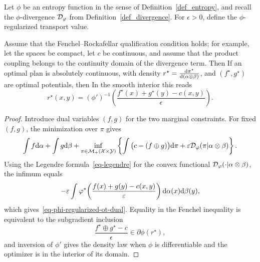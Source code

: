 Let $\phi$ be an entropy function in the sense of Definition~\ref{def_entropy}, and recall the $\phi$-divergence $\mathcal{D}_\varphi$ from Definition~\ref{def_divergence}. For $\epsilon>0$, define the $\phi$-regularized transport value.
\begin{defn}\label{def-phi-regularized-ot}
\end{defn}

\begin{prop}\label{prop-phi-regularized-ot-dual}
	Assume that the Fenchel--Rockafellar qualification condition holds; for example, let the spaces be compact, let $c$ be continuous, and assume that the product coupling belongs to the continuity domain of the divergence term. Then
	If an optimal plan is absolutely continuous, with density $r^\star=\frac{\mathrm{d}\pi^\star}{\mathrm{d}(\alpha\otimes\beta)}$, and $(f^\star,g^\star)$ are optimal potentials, then
	In the smooth interior this reads
	\[
		r^\star(x,y)
		=
		(\phi')^{-1}
		\!\left(\frac{f^\star(x)+g^\star(y)-c(x,y)}{\epsilon}\right).
	\]
\end{prop}

\begin{proof}
	Introduce dual variables $(f,g)$ for the two marginal constraints. For fixed $(f,g)$, the minimization over $\pi$ gives
	\[
		\int f\mathrm{d}\alpha+\int g\mathrm{d}\beta
		+
		\inf_{\pi\in\mathcal{M}_+(\mathcal{X}\times\mathcal{Y})}
		\left\{
		\int\big(c-(f\oplus g)\big)\mathrm{d}\pi
		+
		\varepsilon\mathcal{D}_\varphi(\pi|\alpha\otimes\beta)
		\right\}.
	\]
	Using the Legendre formula~\eqref{eq-legendre} for the convex functional $\mathcal{D}_\varphi(\cdot|\alpha\otimes\beta)$, the infimum equals
	\[
		-\varepsilon
		\int
		\varphi^*\!\left(\frac{f(x)+g(y)-c(x,y)}{\varepsilon}\right)
		\mathrm{d}\alpha(x)\mathrm{d}\beta(y),
	\]
	which gives~\eqref{eq-phi-regularized-ot-dual}. Equality in the Fenchel inequality is equivalent to the subgradient inclusion
	\[
		\frac{f^\star\oplus g^\star-c}{\epsilon}
		\in
		\partial\phi(r^\star),
	\]
	and inversion of $\phi'$ gives the density law when $\phi$ is differentiable and the optimizer is in the interior of its domain.
\end{proof}

